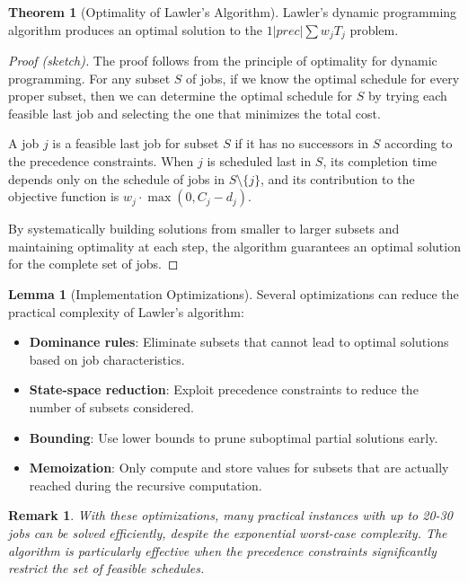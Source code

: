 \documentclass{article}
\newtheorem{remark}{Remark}
\theoremstyle{definition}
\newtheorem{theorem}{Theorem}
\newtheorem{lemma}{Lemma}
\begin{document}
\begin{theorem}[Optimality of Lawler's Algorithm]
Lawler's dynamic programming algorithm produces an optimal solution to the $1|prec|\sum w_jT_j$ problem.
\begin{proof}[Proof (sketch)]
The proof follows from the principle of optimality for dynamic programming. For any subset $S$ of jobs, if we know the optimal schedule for every proper subset, then we can determine the optimal schedule for $S$ by trying each feasible last job and selecting the one that minimizes the total cost.

A job $j$ is a feasible last job for subset $S$ if it has no successors in $S$ according to the precedence constraints. When $j$ is scheduled last in $S$, its completion time depends only on the schedule of jobs in $S \setminus \{j\}$, and its contribution to the objective function is $w_j \cdot \max(0, C_j - d_j)$.

By systematically building solutions from smaller to larger subsets and maintaining optimality at each step, the algorithm guarantees an optimal solution for the complete set of jobs.
\end{proof}
\end{theorem}

\begin{lemma}[Implementation Optimizations]
Several optimizations can reduce the practical complexity of Lawler's algorithm:

\begin{itemize}
    \item \textbf{Dominance rules}: Eliminate subsets that cannot lead to optimal solutions based on job characteristics.
    \item \textbf{State-space reduction}: Exploit precedence constraints to reduce the number of subsets considered.
    \item \textbf{Bounding}: Use lower bounds to prune suboptimal partial solutions early.
    \item \textbf{Memoization}: Only compute and store values for subsets that are actually reached during the recursive computation.
\end{itemize}

\begin{remark}
With these optimizations, many practical instances with up to 20-30 jobs can be solved efficiently, despite the exponential worst-case complexity. The algorithm is particularly effective when the precedence constraints significantly restrict the set of feasible schedules.
\end{remark}
\end{lemma}
\end{document}
